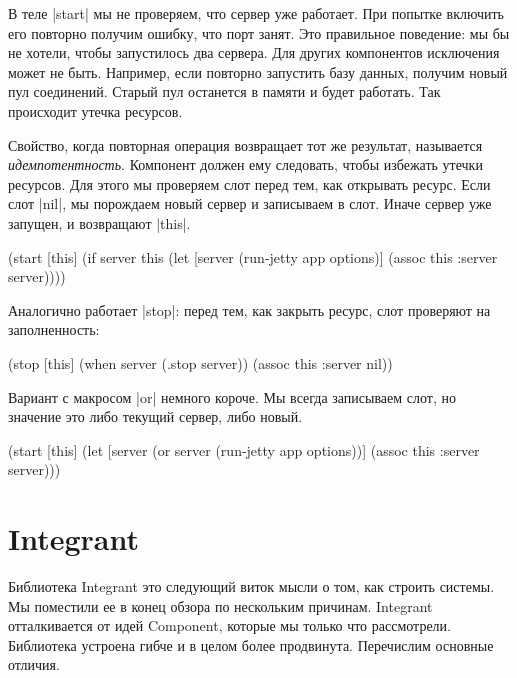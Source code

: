 В теле \spverb|start| мы не проверяем, что сервер уже работает. При попытке
включить его повторно получим ошибку, что порт занят. Это правильное поведение:
мы бы не хотели, чтобы запустилось два сервера. Для других компонентов
исключения может не быть. Например, если повторно запустить базу данных, получим
новый пул соединений. Старый пул останется в памяти и будет работать. Так
происходит утечка ресурсов.

Свойство, когда повторная операция возвращает тот же результат, называется
\emph{идемпотентность}. Компонент должен ему следовать, чтобы избежать утечки
ресурсов. Для этого мы проверяем слот перед тем, как открывать ресурс. Если слот
\spverb|nil|, мы порождаем новый сервер и записываем в слот. Иначе сервер уже
запущен, и возвращают \spverb|this|.

\begin{english}
  \begin{clojure}
(start [this]
  (if server
    this
    (let [server (run-jetty app options)]
      (assoc this :server server))))
  \end{clojure}
\end{english}

Аналогично работает \spverb|stop|: перед тем, как закрыть ресурс, слот проверяют
на заполненность:

\begin{english}
  \begin{clojure}
(stop [this]
  (when server
    (.stop server))
  (assoc this :server nil))
  \end{clojure}
\end{english}

Вариант с макросом \spverb|or| немного короче. Мы всегда записываем слот, но
значение это либо текущий сервер, либо новый.

\begin{english}
  \begin{clojure}
(start [this]
  (let [server (or server (run-jetty app options))]
    (assoc this :server server)))
  \end{clojure}
\end{english}

\section{Integrant}

Библиотека Integrant это
следующий виток мысли о том, как строить системы. Мы поместили ее в конец обзора
по нескольким причинам. Integrant отталкивается от идей Component, которые мы
только что рассмотрели. Библиотека устроена гибче и в целом более
продвинута. Перечислим основные отличия.

